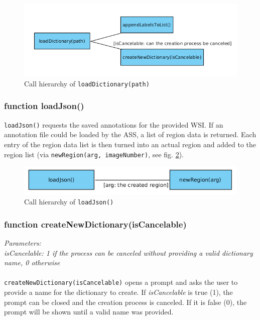 \begin{figure}[H]
	\begin{center}
		\includegraphics[scale=0.5]{img/ch_loadDict.png}
		\caption{Call hierarchy of \texttt{loadDictionary(path)}}
		\label{figB_loadDict}
	\end{center}
\end{figure}


\subsubsection{function loadJson()}
\texttt{loadJson()} requests the saved annotations for the provided WSI. If an annotation file could be loaded by the ASS, a list of region data is returned. Each entry of the region data list is then turned into an actual region and added to the region list (via \texttt{newRegion(arg, imageNumber)}, see fig. \ref{figB_loadJson}).

\begin{figure}[H]
	\begin{center}
		\includegraphics[scale=0.5]{img/ch_loadJson.png}
		\caption{Call hierarchy of \texttt{loadJson()}}
		\label{figB_loadJson}
	\end{center}
\end{figure}


\subsubsection{function createNewDictionary(isCancelable)}
\emph{Parameters:\\
	isCancelable: 1 if the process can be canceled without providing a valid dictionary name, 0 otherwise\\ \\
}
\texttt{createNewDictionary(isCancelable)} opens a prompt and asks the user to provide a name for the dictionary to create. If \emph{isCancelable} is true (1), the prompt can be closed and the creation process is canceled. If it is false (0), the prompt will be shown until a valid name was provided.

